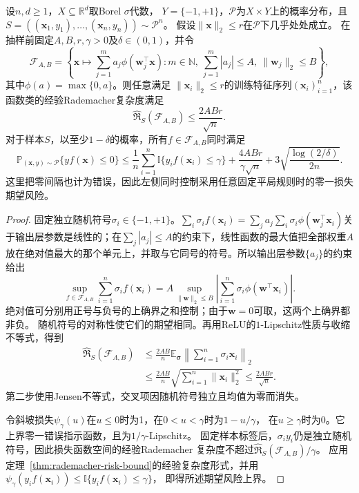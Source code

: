 \begin{theorem}[两层神经网络的范数与期望风险]
\label{thm:two-layer-norm-risk}
设$n,d\geq1$，$X\subseteq\mathbb R^d$取Borel $\sigma$代数，
$Y=\{-1,+1\}$，$\mathcal P$为$X\times Y$上的概率分布，且
$S=((\bm x_1,y_1),\ldots,(\bm x_n,y_n))\sim\mathcal P^n$。
假设$\|\bm x\|_2\leq r$在$\mathcal P$下几乎处处成立。
在抽样前固定$A,B,r,\gamma>0$及$\delta\in(0,1)$，并令
\[
 \mathcal F_{A,B}=\left\{\bm x\mapsto\sum_{j=1}^m a_j\phi(\bm w_j^\top\bm x):
 m\in\mathbb N,\ \sum_{j=1}^m|a_j|\leq A,\ \|\bm w_j\|_2\leq B\right\},
\]
其中$\phi(a)=\max\{0,a\}$。则任意满足
$\|\bm x_i\|_2\leq r$的训练特征序列$(\bm x_i)_{i=1}^n$，该函数类的经验Rademacher复杂度满足
\[
 \widehat{\mathfrak R}_S(\mathcal F_{A,B})\leq\frac{2ABr}{\sqrt n}.
\]
对于样本$S$，以至少$1-\delta$的概率，所有$f\in\mathcal F_{A,B}$同时满足
\begin{equation}
 \mathbb P_{(\bm x,y)\sim\mathcal P}\{yf(\bm x)\leq0\}
 \leq\frac1n\sum_{i=1}^n\mathbb I\{y_i f(\bm x_i)\leq\gamma\}
 +\frac{4ABr}{\gamma\sqrt n}
 +3\sqrt{\frac{\log(2/\delta)}{2n}}.
 \label{eq:two-layer-margin-bound}
\end{equation}
这里把零间隔也计为错误，因此左侧同时控制采用任意固定平局规则时的零一损失期望风险。
\end{theorem}
\begin{proof}
固定独立随机符号$\sigma_i\in\{-1,+1\}$。$\sum_i\sigma_if(\bm x_i)=\sum_ja_j\sum_i\sigma_i\phi(\bm w_j^\top\bm x_i)$关于输出层参数是线性的；在$\sum_j|a_j|\leq A$的约束下，线性函数的最大值把全部权重$A$放在绝对值最大的那个单元上，并取与它同号的符号。所以输出层参数$\{a_j\}$的约束给出
\[
 \sup_{f\in\mathcal F_{A,B}}\sum_{i=1}^n\sigma_i f(\bm x_i)
 =A\sup_{\|\bm w\|_2\leq B}
 \left|\sum_{i=1}^n\sigma_i\phi(\bm w^\top\bm x_i)\right|.
\]
绝对值可分别用正号与负号的上确界之和控制；由于$\bm w=0$可取，这两个上确界都非负。
随机符号的对称性使它们的期望相同。再用ReLU的$1$-Lipschitz性质与收缩不等式，得到
\[
 \begin{aligned}
 \widehat{\mathfrak R}_S(\mathcal F_{A,B})
 &\leq\frac{2AB}{n}\mathbb E_{\bm\sigma}
       \left\|\sum_{i=1}^n\sigma_i\bm x_i\right\|_2\\
 &\leq\frac{2AB}{n}\sqrt{\sum_{i=1}^n\|\bm x_i\|_2^2}
 \leq\frac{2ABr}{\sqrt n}.
 \end{aligned}
\]
第二步使用Jensen不等式，交叉项因随机符号独立且均值为零而消失。

令斜坡损失$\psi_\gamma(u)$在$u\leq0$时为1，在$0<u<\gamma$时为$1-u/\gamma$，
在$u\geq\gamma$时为0。它上界零一错误指示函数，且为$1/\gamma$-Lipschitz。
固定样本标签后，$\sigma_i y_i$仍是独立随机符号，因此损失函数空间的经验Rademacher
复杂度不超过$\widehat{\mathfrak R}_S(\mathcal F_{A,B})/\gamma$。
应用定理~\ref{thm:rademacher-risk-bound}的经验复杂度形式，并用
$\psi_\gamma(y_i f(\bm x_i))\leq\mathbb I\{y_i f(\bm x_i)\leq\gamma\}$，
即得所述期望风险上界。
\end{proof}

